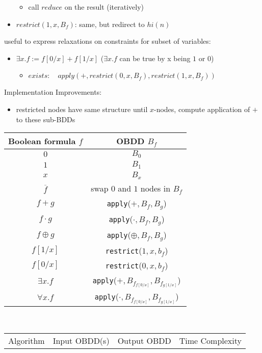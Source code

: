 \documentclass[a4paper, 10pt]{article}
\begin{document}
\begin{mdframed}
\begin{itemize}
\begin{itemize}
        \item call $reduce$ on the result (iteratively)
    \end{itemize}
    \item $restrict(1,x,B_f)$: same, but redirect to $hi(n)$
\end{itemize}
useful to express relaxations on constraints for subset of variables:
\begin{itemize}
    \item $\exists x.f := f[0/x]+f[1/x]$ {\tiny ($\exists x.f$ can be true by x being $1$ or $0$)}
    \begin{itemize}
        \item $exists:\quad apply(+,restrict(0,x,B_f),restrict(1,x,B_f))$
    \end{itemize}
\end{itemize}
Implementation Improvements:
\begin{itemize}
    \item restricted nodes have same structure until $x$-nodes, compute application of $+$ to these sub-BDDs
\end{itemize}
\begin{center}\begin{tabular}{c|c}
Boolean formula $f$ & OBDD $B_f$ \\
\hline
$0$            & $B_0$ \\
$1$            & $B_1$ \\
$x$            & $B_x$ \\
$\overline{f}$ & swap $0$ and $1$ nodes in $B_f$ \\
$f+g$          & \texttt{apply}($+,B_f,B_g$) \\
$f\cdot g$     & \texttt{apply}($\cdot,B_f,B_g$) \\
$f\oplus g$    & \texttt{apply}($\oplus,B_f,B_g$) \\
$f[1/x]$       & \texttt{restrict}($1,x,b_f$) \\
$f[0/x]$       & \texttt{restrict}($0,x,b_f$) \\
$\exists x.f$  & \texttt{apply}($+,B_{f_{f[0/x]}},B_{f_{g[1/x]}}$) \\
$\forall x.f$  & \texttt{apply}($\cdot,B_{f_{f[0/x]}},B_{f_{g[1/x]}}$) \\
\end{tabular} \\[.5cm]
\begin{tabular}{l|l|l|l}
Algorithm & Input OBDD(s) & Output OBDD & Time Complexity \\

\end{tabular}
\end{center}
\end{mdframed}
\end{document}

